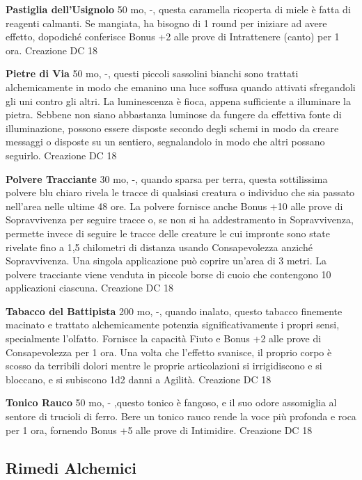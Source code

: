 \documentclass[a4paper,11pt,twoside,openany]{book}
\begin{document}
\textbf{Pastiglia dell'Usignolo} 50 mo, -, questa caramella ricoperta di miele è fatta di reagenti calmanti. Se mangiata, ha bisogno di 1 round per iniziare ad avere effetto, dopodiché conferisce Bonus +2 alle prove di Intrattenere (canto) per 1 ora. Creazione DC 18

\textbf{Pietre di Via} 50 mo, -, questi piccoli sassolini bianchi sono trattati alchemicamente in modo che emanino una luce soffusa quando attivati sfregandoli gli uni contro gli altri. La luminescenza è fioca, appena sufficiente a illuminare la pietra.
Sebbene non siano abbastanza luminose da fungere da effettiva fonte di illuminazione, possono essere disposte secondo degli schemi in modo da creare messaggi o disposte su un sentiero, segnalandolo in modo che altri possano seguirlo. Creazione DC 18

\textbf{Polvere Tracciante} 30 mo, -, quando sparsa per terra, questa sottilissima polvere blu chiaro rivela le tracce di qualsiasi creatura o individuo che sia passato nell'area nelle ultime 48 ore.
La polvere fornisce anche Bonus +10 alle prove di Sopravvivenza per seguire tracce o, se non si ha addestramento in Sopravvivenza, permette invece di seguire le tracce delle creature le cui impronte sono state rivelate fino a 1,5 chilometri di distanza usando Consapevolezza anziché Sopravvivenza. Una singola applicazione può coprire un'area di 3 metri.
La polvere tracciante viene venduta in piccole borse di cuoio che contengono 10 applicazioni ciascuna. Creazione DC 18

\textbf{Tabacco del Battipista} 200 mo, -, quando inalato, questo tabacco finemente macinato e trattato alchemicamente potenzia significativamente i propri sensi, specialmente l'olfatto. Fornisce la capacità Fiuto e Bonus +2 alle prove di Consapevolezza per 1 ora. Una volta che l'effetto svanisce, il proprio corpo è scosso da terribili dolori mentre le proprie articolazioni si irrigidiscono e si bloccano, e si subiscono 1d2 danni a Agilità. Creazione DC 18

\textbf{Tonico Rauco} 50 mo, - ,questo tonico è fangoso, e il suo odore assomiglia al sentore di trucioli di ferro. Bere un tonico rauco rende la voce più profonda e roca per 1 ora, fornendo Bonus +5 alle prove di Intimidire. Creazione DC 18

\subsection{Rimedi Alchemici}
\end{document}
